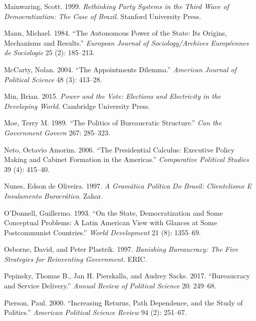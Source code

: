 \documentclass[12pt,]{article}
\begin{document}
\leavevmode\hypertarget{ref-mainwaring_rethinking_1999}{}%
Mainwaring, Scott. 1999. \emph{Rethinking Party Systems in the Third
Wave of Democratization: The Case of Brazil}. Stanford University Press.

\leavevmode\hypertarget{ref-mann_autonomous_1984}{}%
Mann, Michael. 1984. ``The Autonomous Power of the State: Its Origins,
Mechanisms and Results.'' \emph{European Journal of Sociology/Archives
Européennes de Sociologie} 25 (2): 185--213.

\leavevmode\hypertarget{ref-mccarty_appointments_2004}{}%
McCarty, Nolan. 2004. ``The Appointments Dilemma.'' \emph{American
Journal of Political Science} 48 (3): 413--28.

\leavevmode\hypertarget{ref-min_power_2015}{}%
Min, Brian. 2015. \emph{Power and the Vote: Elections and Electricity in
the Developing World}. Cambridge University Press.

\leavevmode\hypertarget{ref-moe_politics_1989}{}%
Moe, Terry M. 1989. ``The Politics of Bureaucratic Structure.''
\emph{Can the Government Govern} 267: 285--323.

\leavevmode\hypertarget{ref-neto_presidential_2006}{}%
Neto, Octavio Amorim. 2006. ``The Presidential Calculus: Executive
Policy Making and Cabinet Formation in the Americas.'' \emph{Comparative
Political Studies} 39 (4): 415--40.

\leavevmode\hypertarget{ref-nunes_gramatica_1997}{}%
Nunes, Edson de Oliveira. 1997. \emph{A Gramática Política Do Brasil:
Clientelismo E Insulamento Burocrático}. Zahar.

\leavevmode\hypertarget{ref-odonnell_state_1993}{}%
O'Donnell, Guillermo. 1993. ``On the State, Democratization and Some
Conceptual Problems: A Latin American View with Glances at Some
Postcommunist Countries.'' \emph{World Development} 21 (8): 1355--69.

\leavevmode\hypertarget{ref-osborne_banishing_1997}{}%
Osborne, David, and Peter Plastrik. 1997. \emph{Banishing Bureaucracy:
The Five Strategies for Reinventing Government.} ERIC.

\leavevmode\hypertarget{ref-pepinsky_bureaucracy_2017}{}%
Pepinsky, Thomas B., Jan H. Pierskalla, and Audrey Sacks. 2017.
``Bureaucracy and Service Delivery.'' \emph{Annual Review of Political
Science} 20: 249--68.

\leavevmode\hypertarget{ref-pierson_increasing_2000}{}%
Pierson, Paul. 2000. ``Increasing Returns, Path Dependence, and the
Study of Politics.'' \emph{American Political Science Review} 94 (2):
251--67.
\end{document}
